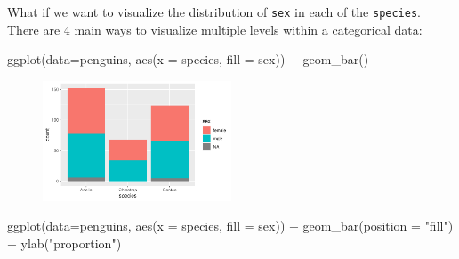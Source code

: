 \documentclass[
  letterpaper,
  DIV=11,
  numbers=noendperiod]{scrreprt}
\newenvironment{Shaded}{\begin{snugshade}}{\end{snugshade}}
\newcommand{\AttributeTok}[1]{\textcolor[rgb]{0.40,0.45,0.13}{#1}}
\newcommand{\FunctionTok}[1]{\textcolor[rgb]{0.28,0.35,0.67}{#1}}
\newcommand{\NormalTok}[1]{\textcolor[rgb]{0.00,0.23,0.31}{#1}}
\newcommand{\SpecialCharTok}[1]{\textcolor[rgb]{0.37,0.37,0.37}{#1}}
\newcommand{\StringTok}[1]{\textcolor[rgb]{0.13,0.47,0.30}{#1}}
\begin{document}
\begin{tcolorbox}[enhanced jigsaw, colframe=quarto-callout-note-color-frame, breakable, colback=white, toprule=.15mm, leftrule=.75mm, left=2mm, opacityback=0, rightrule=.15mm, arc=.35mm, bottomrule=.15mm]

What if we want to visualize the distribution of \texttt{sex} in each of
the \texttt{species}. There are 4 main ways to visualize multiple levels
within a categorical data:

\begin{Shaded}
\begin{Highlighting}[]
\FunctionTok{ggplot}\NormalTok{(}\AttributeTok{data=}\NormalTok{penguins, }\FunctionTok{aes}\NormalTok{(}\AttributeTok{x =}\NormalTok{ species, }\AttributeTok{fill =}\NormalTok{ sex)) }\SpecialCharTok{+}
  \FunctionTok{geom\_bar}\NormalTok{()}
\end{Highlighting}
\end{Shaded}

\begin{figure}[H]

{\centering \includegraphics[width=0.5\textwidth,height=\textheight]{05-content_files/figure-pdf/cat-barplot-1.pdf}

}

\end{figure}

\begin{Shaded}
\begin{Highlighting}[]
\FunctionTok{ggplot}\NormalTok{(}\AttributeTok{data=}\NormalTok{penguins, }\FunctionTok{aes}\NormalTok{(}\AttributeTok{x =}\NormalTok{ species, }\AttributeTok{fill =}\NormalTok{ sex)) }\SpecialCharTok{+}
  \FunctionTok{geom\_bar}\NormalTok{(}\AttributeTok{position =} \StringTok{"fill"}\NormalTok{) }\SpecialCharTok{+}
  \FunctionTok{ylab}\NormalTok{(}\StringTok{"proportion"}\NormalTok{)}
\end{Highlighting}
\end{Shaded}

\begin{figure}[H]


\end{figure}
\end{tcolorbox}
\end{document}
